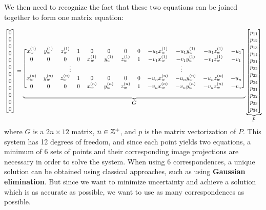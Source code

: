 We then need to recognize the fact that these two equations can be joined together to form one matrix equation:

\setcounter{MaxMatrixCols}{20}
\begin{equation}
    \scalemath{0.9}{
    \begin{bmatrix}
        0 \\ 0 \\ 0 \\ 0 \\ 0 \\ 0 \\ 0 \\ 0 \\ 0 \\ 0 \\ 0 \\ 0
    \end{bmatrix}
    =
    \underbrace{
        \begin{blockarray}{[*{12}c]}
            x_w^{(1)} & y_w^{(1)} & z_w^{(1)} & 1 & 0         & 0         & 0         & 0 & -u_1 x_w^{(1)} & -u_1 y_w^{(1)} & -u_1 z_w^{(1)} & -u_1 \\
            0         & 0         & 0         & 0 & x_w^{(1)} & y_w^{(1)} & z_w^{(1)} & 1 & -v_1 x_w^{(1)} & -v_1 y_w^{(1)} & -v_1 z_w^{(1)} & -v_1 \\
            \BAmulticolumn{6}{c}{\vdots} & \BAmulticolumn{6}{c}{\vdots} \\
            x_w^{(n)} & y_w^{(n)} & z_w^{(n)} & 1 & 0         & 0         & 0         & 0 & -u_n x_w^{(n)} & -u_n y_w^{(n)} & -u_n z_w^{(n)} & -u_n \\
            0         & 0         & 0         & 0 & x_w^{(n)} & y_w^{(n)} & z_w^{(n)} & 1 & -v_n x_w^{(n)} & -v_n y_w^{(n)} & -v_n z_w^{(n)} & -v_n
        \end{blockarray}
    }_{\mathlarger{G}}
    \underbrace{
        \begin{bmatrix}
            p_{11} \\ p_{12} \\ p_{13} \\ p_{14} \\ p_{21} \\ p_{22} \\ p_{23} \\ p_{24} \\ p_{31} \\ p_{32} \\ p_{33} \\ p_{34}
        \end{bmatrix}
    }_{\mathlarger{p}}
    }
\end{equation}
where $G$ is a $2n \times 12$ matrix, $n \in \mathbb{Z}^+$, and $p$ is the matrix vectorization of $P$. This system has 12 degrees of freedom, and since each point yields two equations, a minimum of 6 sets of points and their corresponding image projections are necessary in order to solve the system. When using 6 correspondences, a unique solution can be obtained using classical approaches, such as using 
\textbf{Gaussian elimination}. But since we want to minimize uncertainty and achieve a solution which is as accurate as possible, we want to use as many correspondences as possible. 

